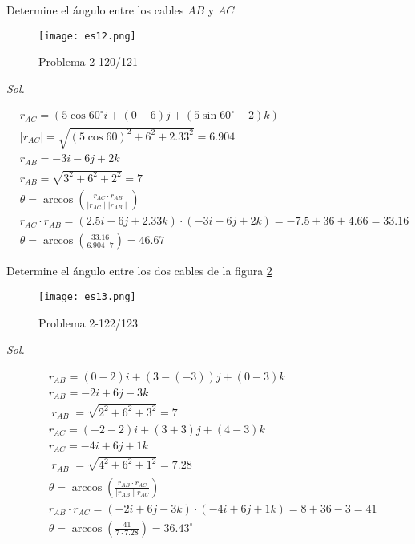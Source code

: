 \begin{problem}
Determine el ángulo entre los cables $AB$ y $AC$
\end{problem}

\begin{figure}[h!]
	\centering
	\texttt{[image: es12.png]}
	\caption{Problema 2-120/121}
	\label{es12}
\end{figure}

\textit{ Sol. }


\begin{align*}
	 & r_{AC}=\left(5\cos 60^{\circ}i+(0-6)j+(5\sin 60^{\circ}-2)k\right)                     \\
	 & \mid r_{AC}\mid=\sqrt{(5\cos 60)^2+6^2+2.33^2}=6.904                                   \\
	 & r_{AB}=-3i-6j+2k                                                                       \\
	 & r_{AB}=\sqrt{3^2+6^2+2^2}=7                                                            \\
	 & \theta=\arccos\left(\frac{r_{AC}\cdot r_{AB}}{\mid r_{AC}\mid \mid r_{AB}\mid }\right) \\
	 & r_{AC}\cdot r_{AB}=(2.5i-6j+2.33k)\cdot (-3i-6j+2k)=-7.5+36+4.66=33.16                 \\
	 & \theta=\arccos\left(\frac{33.16}{6.904\cdot 7}\right)=46.67
\end{align*}

\begin{problem}
Determine el ángulo entre los dos cables de la figura \ref{es13}
\end{problem}

\begin{figure}[h!]
	\centering
	\texttt{[image: es13.png]}
	\caption{Problema 2-122/123}
	\label{es13}
\end{figure}


\textit{ Sol. }


\begin{align*}
	 & r_{AB}=(0-2)i+\left(3-(-3)\right)j+(0-3)k                                    \\
	 & r_{AB}=-2i+6j-3k                                                             \\
	 & \mid r_{AB}\mid =\sqrt{2^2+6^2+3^2}=7                                        \\
	 & r_{AC}=(-2-2)i+(3+3)j+(4-3)k                                                 \\
	 & r_{AC}=-4i+6j+1k                                                             \\
	 & \mid r_{AB}\mid =\sqrt{4^2+6^2+1^2}=7.28                                     \\
	 & \theta=\arccos\left(\frac{r_{AB}\cdot r_{AC}}{\mid r_{AB}\mid r_{AC}}\right) \\
	 & r_{AB}\cdot r_{AC}=(-2i+6j-3k)\cdot (-4i+6j+1k)=8+36-3=41                    \\
	 & \theta=\arccos\left(\frac{41}{7\cdot 7.28}\right)=36.43^{\circ}
\end{align*}


